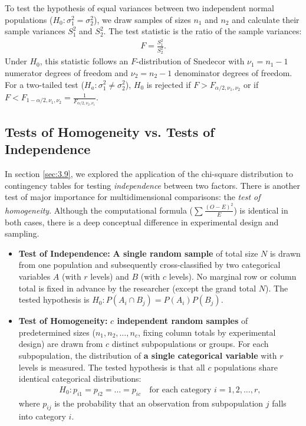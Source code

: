 \begin{teorema}
	To test the hypothesis of equal variances between two independent normal populations ($H_0: \sigma_1^2 = \sigma_2^2$), we draw samples of sizes $n_1$ and $n_2$ and calculate their sample variances $S_1^2$ and $S_2^2$. The test statistic is the ratio of the sample variances:
	\begin{align}
		F = \frac{S_1^2}{S_2^2}.
	\end{align}
	Under $H_0$, this statistic follows an $F$-distribution of Snedecor with $\nu_1 = n_1 - 1$ numerator degrees of freedom and $\nu_2 = n_2 - 1$ denominator degrees of freedom.
	For a two-tailed test ($H_a: \sigma_1^2 \neq \sigma_2^2$), $H_0$ is rejected if $F > F_{\alpha/2, \nu_1, \nu_2}$ or if $F < F_{1-\alpha/2, \nu_1, \nu_2} = \frac{1}{F_{\alpha/2, \nu_2, \nu_1}}$.
\end{teorema}

\subsection{Tests of Homogeneity vs. Tests of Independence}

In section \ref{sec:3.9}, we explored the application of the chi-square distribution to contingency tables for testing \emph{independence} between two factors. There is another test of major importance for multidimensional comparisons: the \emph{test of homogeneity}. Although the computational formula ($\sum \frac{(O-E)^2}{E}$) is identical in both cases, there is a deep conceptual difference in experimental design and sampling.

\begin{definicion}
	\begin{itemize}
		\item \textbf{Test of Independence:} \textbf{A single random sample} of total size $N$ is drawn from one population and subsequently cross-classified by two categorical variables $A$ (with $r$ levels) and $B$ (with $c$ levels). No marginal row or column total is fixed in advance by the researcher (except the grand total $N$). The tested hypothesis is $H_0: P(A_i \cap B_j) = P(A_i)P(B_j)$.
		\item \textbf{Test of Homogeneity:} \textbf{$c$ independent random samples} of predetermined sizes ($n_1, n_2, \ldots, n_c$, fixing column totals by experimental design) are drawn from $c$ distinct subpopulations or groups. For each subpopulation, the distribution of \textbf{a single categorical variable} with $r$ levels is measured. The tested hypothesis is that all $c$ populations share identical categorical distributions:
		\begin{align}
			H_0: p_{i1} = p_{i2} = \ldots = p_{ic} \quad \text{for each category } i = 1, 2, \ldots, r,
		\end{align}
		where $p_{ij}$ is the probability that an observation from subpopulation $j$ falls into category $i$.
	\end{itemize}
\end{definicion}

